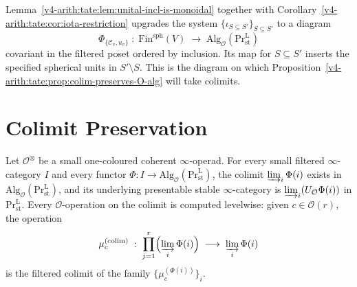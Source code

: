 \begin{remark}
\label{v4-arith:tate:rem:iota-2cells}
Lemma~\ref{v4-arith:tate:lem:unital-incl-is-monoidal} together with
Corollary~\ref{v4-arith:tate:cor:iota-restriction} upgrades the system
\(\{\iota_{S\subseteq S'}\}_{S\subseteq S'}\) to a diagram
\[
\Phi_{\{\mathcal{C}_{v},u_{v}\}}\;:\;\mathrm{Fin}^{\mathrm{sph}}(V)\;\longrightarrow\;\mathrm{Alg}_{\mathcal{O}}(\mathrm{Pr}^{\mathrm{L}}_{\mathrm{st}})
\]
covariant in the filtered poset ordered by inclusion. Its map for
\(S\subseteq S'\) inserts the specified spherical units in
\(S'\setminus S\).
This is the diagram on which
Proposition~\ref{v4-arith:tate:prop:colim-preserves-O-alg} will
take colimits.
\end{remark}

\section{Colimit Preservation}
\label{v4-arith:tate:colim-preservation}

\begin{proposition}
\label{v4-arith:tate:prop:colim-preserves-O-alg}
\ClaimStatusProvedHere Let \(\mathcal{O}^{\otimes}\) be a small
one-coloured coherent \(\infty\)-operad. For every small
filtered \(\infty\)-category \(I\) and every functor
\(\Phi:I\to\mathrm{Alg}_{\mathcal{O}}(\mathrm{Pr}^{\mathrm{L}}_{\mathrm{st}})\),
the colimit \(\varinjlim_{i}\Phi(i)\) exists in
\(\mathrm{Alg}_{\mathcal{O}}(\mathrm{Pr}^{\mathrm{L}}_{\mathrm{st}})\),
and its underlying presentable stable \(\infty\)-category is
\(\varinjlim_{i}(U_{\mathcal{O}}\Phi(i))\) in
\(\mathrm{Pr}^{\mathrm{L}}_{\mathrm{st}}\). Every \(\mathcal{O}\)-operation
on the colimit is computed levelwise: given
\(c\in\mathcal{O}(r)\), the operation
\[
\mu_{c}^{(\mathrm{colim})}\;:\;\prod_{j=1}^{r}\Bigl(\varinjlim_{i}\Phi(i)\Bigr)\;\longrightarrow\;\varinjlim_{i}\Phi(i)
\]
is the filtered colimit of the family
\(\{\mu_{c}^{(\Phi(i))}\}_{i}\).
\end{proposition}

